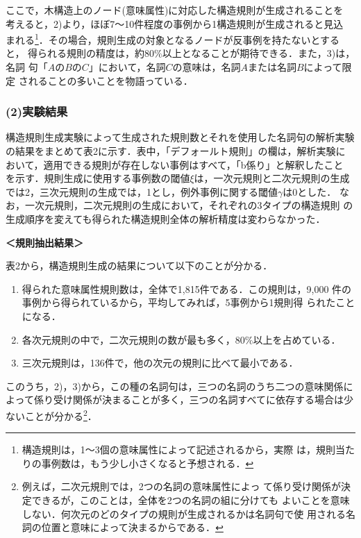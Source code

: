 ここで，木構造上のノード(意味属性)に対応した構造規則が生成されることを
考えると，2)より，ほぼ7〜10件程度の事例から1構造規則が生成されると見込
まれる\footnote{構造規則は，1〜3個の意味属性によって記述されるから，実際
は，規則当たりの事例数は，もう少し小さくなると予想される．}．その場合，規則生成の対象となるノードが反事例を持たないとすると，
得られる規則の精度は，約$80\%$以上となることが期待できる．また，3)は，名詞
句「$AのBのC$」において，名詞$C$の意味は，名詞$A$または名詞$B$によって限定
されることの多いことを物語っている．
\subsubsection{(2)実験結果}

構造規則生成実験によって生成された規則数とそれを使用した名詞句の解析実験
の結果をまとめて表2に示す．表中，「デフォールト規則」の欄は，解析実験に
おいて，適用できる規則が存在しない事例はすべて，「b係り」と解釈したこと
を示す．規則生成に使用する事例数の閾値$\xi$は，一次元規則と二次元規則の生成
では2，三次元規則の生成では，1とし，例外事例に関する閾値$\gamma$は0とした．
なお，一次元規則，二次元規則の生成において，それぞれの3タイプの構造規則
の生成順序を変えても得られた構造規則全体の解析精度は変わらなかった．
\vspace{\baselineskip}

\noindent
{\bf ＜規則抽出結果＞}

表2から，構造規則生成の結果について以下のことが分かる．\vspace{\baselineskip}
\begin{enumerate}
 \item 得られた意味属性規則数は，全体で1,815件である．この規則は，9,000
       件の事例から得られているから，平均してみれば，5事例から1規則得
       られたことになる．
 \item 各次元規則の中で，二次元規則の数が最も多く，$80\%$以上を占めている．
 \item 三次元規則は，136件で，他の次元の規則に比べて最小である．
\end{enumerate}\vspace{\baselineskip}

このうち，2)，3)から，この種の名詞句は，三つの名詞のうち二つの意味関係に
よって係り受け関係が決まることが多く，三つの名詞すべてに依存する場合は少
ないことが分かる\footnote{例えば，二次元規則では，2つの名詞の意味属性によっ
て係り受け関係が決定できるが，このことは，全体を2つの名詞の組に分けても
よいことを意味しない．何次元のどのタイプの規則が生成されるかは名詞句で使
用される名詞の位置と意味によって決まるからである．}．

